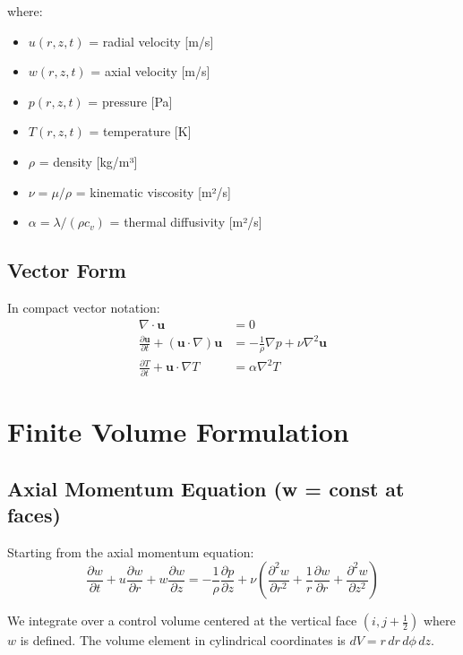 where:
\begin{itemize}
    \item $u(r,z,t)$ = radial velocity [m/s]
    \item $w(r,z,t)$ = axial velocity [m/s]
    \item $p(r,z,t)$ = pressure [Pa]
    \item $T(r,z,t)$ = temperature [K]
    \item $\rho$ = density [kg/m³]
    \item $\nu = \mu/\rho$ = kinematic viscosity [m²/s]
    \item $\alpha = \lambda/(\rho c_v)$ = thermal diffusivity [m²/s]
\end{itemize}

\subsection{Vector Form}

In compact vector notation:
\begin{align}
    \nabla \cdot \mathbf{u} &= 0 \\
    \frac{\partial \mathbf{u}}{\partial t} + (\mathbf{u} \cdot \nabla)\mathbf{u} &= -\frac{1}{\rho}\nabla p + \nu \nabla^2 \mathbf{u} \\
    \frac{\partial T}{\partial t} + \mathbf{u} \cdot \nabla T &= \alpha \nabla^2 T
\end{align}

\section{Finite Volume Formulation}

\subsection{Axial Momentum Equation (w = const at faces)}

Starting from the axial momentum equation:
\begin{equation}
    \frac{\partial w}{\partial t} + u\frac{\partial w}{\partial r} + w\frac{\partial w}{\partial z} = -\frac{1}{\rho}\frac{\partial p}{\partial z} + \nu\left(\frac{\partial^2 w}{\partial r^2} + \frac{1}{r}\frac{\partial w}{\partial r} + \frac{\partial^2 w}{\partial z^2}\right)
\end{equation}

We integrate over a control volume centered at the vertical face $(i, j+\frac{1}{2})$ where $w$ is defined. The volume element in cylindrical coordinates is $dV = r\,dr\,d\phi\,dz$.


